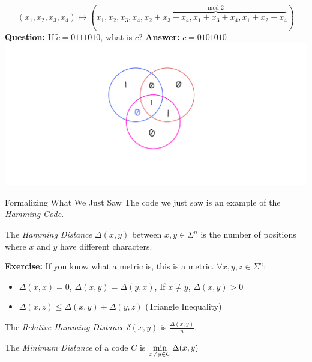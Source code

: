 \documentclass[aspectratio=169]{beamer}
\begin{document}
\begin{frame}{}
\[
(x_1, x_2, x_3, x_4) \mapsto (x_1, x_2, x_3, x_4, \overbrace{x_2 + x_3 + x_4, x_1 + x_3 + x_4, x_1 + x_2 + x_4}^{\text{mod }2})
\]
\textcolor{sigma@alertred}{\textbf{Question:}} If $\tilde{c} = 0111010$, what is $c$? \hfill \textcolor{sigma@mainblue}{\textbf{Answer:}} $c = 0101010$
    \includegraphics[width=\textwidth]{images/coding-05.png}
\end{frame}

\begin{frame}{Formalizing What We Just Saw}
    The code we just saw is an example of the \emph{Hamming Code}.
    \begin{defn}
        The \emph{Hamming Distance} $\Delta(x, y)$ between $x, y \in \Sigma^n$ is the number of positions where $x$ and $y$ have different characters. \pause
        
        \textcolor{sigma@alertred}{\textbf{Exercise:}} If you know what a metric is, this is a metric. $\forall x, y, z \in \Sigma^n$:
        \begin{itemize}
            \item $\Delta(x, x) = 0$, $\Delta(x, y) = \Delta(y, x)$, If $x \neq y$, $\Delta(x, y) > 0$
            \item $\Delta(x, z) \leq \Delta(x, y) + \Delta(y, z)$ (Triangle Inequality)
        \end{itemize}
        \pause
    
        The \emph{Relative Hamming Distance} $\delta(x, y)$ is $\frac{\Delta(x, y)}{n}$.
    \end{defn} \pause

    \begin{defn}
        The \emph{Minimum Distance} of a code $C$ is $\min\limits_{x \neq y \in C} \Delta(x, y)$
    \end{defn}
\end{frame}
\end{document}
